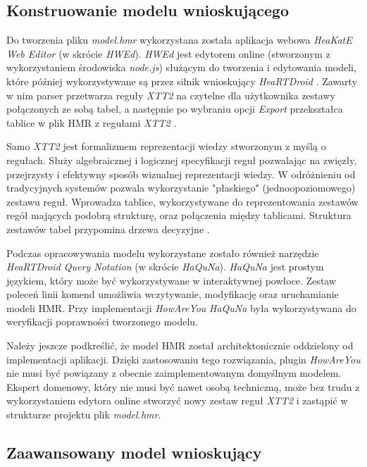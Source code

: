 \subsection{Konstruowanie modelu wnioskującego}

Do tworzenia pliku \textit{model.hmr} wykorzystana została aplikacja webowa \textit{HeaKatE Web Editor} (w skrócie \textit{HWEd}). \textit{HWEd} jest edytorem online (stworzonym z wykorzystaniem środowiska \textit{node.js}) służącym do tworzenia i edytowania modeli, które później wykorzystywane są przez silnik wnioskujący \textit{HeaRTDroid} \cite{heartdroid}. Zawarty w nim parser przetwarza reguły \textit{XTT2} na czytelne dla użytkownika zestawy połączonych ze sobą tabel, a następnie po wybraniu opcji \textit{Export} przekształca tablice w plik HMR z regułami \textit{XTT2} \cite{heartdroid}.

Samo \textit{XTT2} jest formalizmem reprezentacji wiedzy stworzonym z myślą o regułach. Służy algebraicznej i logicznej specyfikacji reguł pozwalając na zwięzły, przejrzysty i efektywny sposób wizualnej reprezentacji wiedzy. W odróżnieniu od tradycyjnych systemów pozwala wykorzystanie "płaskiego" (jednoopoziomowego) zestawu reguł. Wprowadza tablice, wykorzystywane do reprezentowania zestawów regół mających podobrą strukturę, oraz połączenia między tablicami. Struktura zestawów tabel przypomina drzewa decyzyjne \cite{AiWikiHekate}.

Podczas opracowywania modelu wykorzystane zostało również narzędzie \textit{HeaRTDroid Query Notation} (w skrócie \textit{HaQuNa}). \textit{HaQuNa} jest prostym językiem, który może być wykorzystywane w interaktywnej powłoce. Zestaw poleceń linii komend umożliwia wczytywanie, modyfikację oraz uruchamianie modeli HMR\cite{heartdroid}. Przy implementacji \textit{HowAreYou} \textit{HaQuNa} była wykorzystywana do weryfikacji poprawności tworzonego modelu.

Należy jeszcze podkreślić, że model HMR został architektonicznie oddzielony od implementacji aplikacji. Dzięki zastosowaniu tego rozwiązania, plugin \textit{HowAreYou} nie musi być powiązany z obecnie zaimplementowanym domyślnym modelem. Ekspert domenowy, który nie musi być nawet osobą techniczną, może bez trudu z wykorzystaniem edytora online stworzyć nowy zestaw reguł \textit{XTT2} i zastąpić w strukturze projektu plik \textit{model.hmr}.

\subsection{Zaawansowany model wnioskujący}


